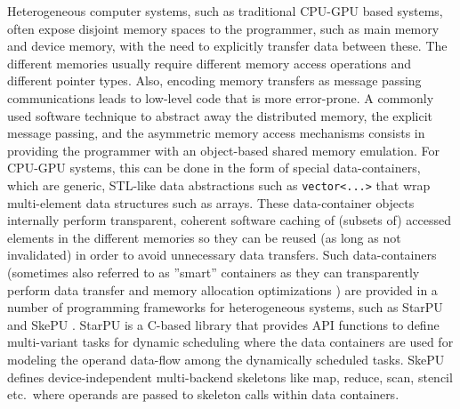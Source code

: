 Heterogeneous computer systems, such as traditional CPU-GPU based systems, 
often expose disjoint memory spaces to the programmer,
such as main memory and device memory, with the need
to explicitly transfer data between these.
The different memories usually 
require different memory access operations and
different pointer types. %
Also, encoding memory transfers as message passing communications
leads to low-level code that is more error-prone. 
A commonly used software technique to abstract away the
distributed memory, the explicit message passing,
and the asymmetric memory access mechanisms
consists in providing the programmer with an 
object-based shared memory emulation. For CPU-GPU systems,
this can be done in the form of special data-containers,
which are generic, STL-like data abstractions such as 
\verb+vector<...>+ that 
wrap multi-element data structures such as arrays. These 
data-container objects
 internally perform transparent, coherent
software caching
of (subsets of) accessed elements in the different memories 
so they can be reused (as long as not invalidated) 
in order to
avoid unnecessary data transfers. Such data-containers 
(sometimes also referred to as ''smart'' containers as they can
transparently perform data transfer and memory allocation optimizations
\cite{Dastgeer-IJPP15}) 
are provided in a number of programming frameworks 
for heterogeneous systems, such as
StarPU \cite{StarPU} and SkePU \cite{Enmyren10,Dastgeer-IJPP15}. StarPU is a 
C-based library that provides API functions to
define multi-variant tasks for dynamic scheduling
where the data containers are used for modeling 
the operand data-flow
among the dynamically scheduled tasks. 
SkePU defines device-independent 
multi-backend skeletons like map, reduce,
scan, stencil etc.\ where operands are
passed to skeleton calls within data containers.

